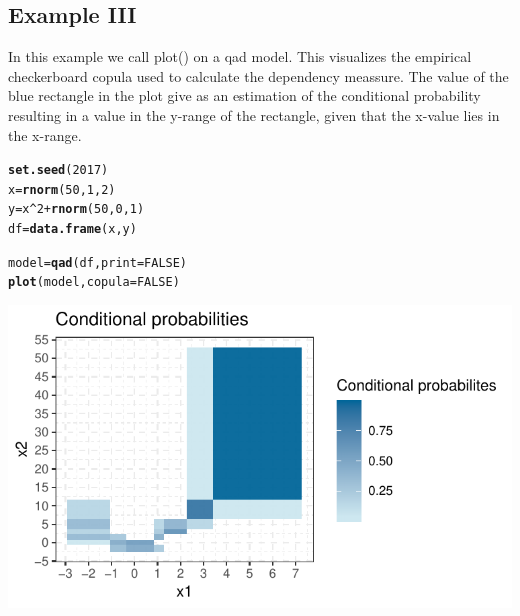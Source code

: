 \documentclass{scrartcl}\usepackage[]{graphicx}\usepackage[]{color}
\makeatletter
\def\maxwidth{ %
  \ifdim\Gin@nat@width>\linewidth
    \linewidth
  \else
    \Gin@nat@width
  \fi
}
\newcommand{\hlnum}[1]{\textcolor[rgb]{0.686,0.059,0.569}{#1}}%
\newcommand{\hlopt}[1]{\textcolor[rgb]{0,0,0}{#1}}%
\newcommand{\hlstd}[1]{\textcolor[rgb]{0.345,0.345,0.345}{#1}}%
\newcommand{\hlkwb}[1]{\textcolor[rgb]{0.69,0.353,0.396}{#1}}%
\newcommand{\hlkwc}[1]{\textcolor[rgb]{0.333,0.667,0.333}{#1}}%
\newcommand{\hlkwd}[1]{\textcolor[rgb]{0.737,0.353,0.396}{\textbf{#1}}}%
\newenvironment{kframe}{%
 \def\at@end@of@kframe{}%
 \ifinner\ifhmode%
  \def\at@end@of@kframe{\end{minipage}}%
  \begin{minipage}{\columnwidth}%
 \fi\fi%
 \def\FrameCommand##1{\hskip\@totalleftmargin \hskip-\fboxsep
 \colorbox{shadecolor}{##1}\hskip-\fboxsep
     \hskip-\linewidth \hskip-\@totalleftmargin \hskip\columnwidth}%
 \MakeFramed {\advance\hsize-\width
   \@totalleftmargin\z@ \linewidth\hsize
   \@setminipage}}%
 {\par\unskip\endMakeFramed%
 \at@end@of@kframe}
\newenvironment{knitrout}{}{} %
\makeatother
\begin{document}
\subsection{Example III}
In this example we call plot() on a qad model. This visualizes the empirical checkerboard copula used to calculate the dependency meassure. The value of the blue rectangle in the plot give as an estimation of the conditional probability resulting in a value in the y-range of the rectangle, given that the x-value lies in the x-range.
\begin{knitrout}
\color{fgcolor}\begin{kframe}
\begin{alltt}
\hlkwd{set.seed}\hlstd{(}\hlnum{2017}\hlstd{)}
\hlstd{x} \hlkwb{=} \hlkwd{rnorm}\hlstd{(}\hlnum{50}\hlstd{,}\hlnum{1}\hlstd{,}\hlnum{2}\hlstd{)}
\hlstd{y} \hlkwb{=} \hlstd{x}\hlopt{^}\hlnum{2} \hlopt{+} \hlkwd{rnorm}\hlstd{(}\hlnum{50}\hlstd{,}\hlnum{0}\hlstd{,}\hlnum{1}\hlstd{)}
\hlstd{df} \hlkwb{=} \hlkwd{data.frame}\hlstd{(x,y)}

\hlstd{model} \hlkwb{=} \hlkwd{qad}\hlstd{(df,}\hlkwc{print}\hlstd{=}\hlnum{FALSE}\hlstd{)}
\hlkwd{plot}\hlstd{(model,} \hlkwc{copula} \hlstd{=} \hlnum{FALSE}\hlstd{)}
\end{alltt}
\end{kframe}
\includegraphics[width=\maxwidth]{figure/unnamed-chunk-7-1} 

\end{knitrout}
\end{document}
